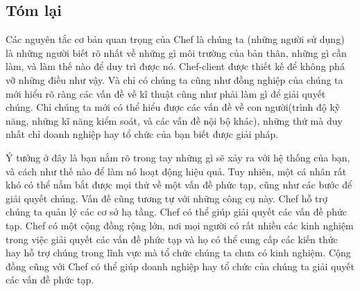 \newpage
\clearpage

\subsection*{Tóm lại}

Các nguyên tắc cơ bản quan trọng của Chef là chúng ta (những người sử dụng) là những người biết rõ nhất về những gì môi trường của bản thân, những gì cần làm, và làm thế nào để duy trì được nó. Chef-client được thiết kế để không phá vỡ những điều như vậy. Và chỉ có chúng ta cũng như đồng nghiệp của chúng ta mới hiểu rõ ràng các vấn đề về kĩ thuật cũng như phải làm gì để giải quyết chúng. Chỉ chúng ta mới có thể hiểu được các vấn đề về con người(trình độ kỹ năng, những kĩ năng kiểm soát, và các vấn đề nội bộ khác), những thứ mà duy nhất chỉ doanh nghiệp hay tổ chức của bạn biết được giải pháp.

Ý tưởng ở đây là bạn nắm rõ trong tay những gì sẽ xảy ra với hệ thống của bạn, và cách như thế nào để làm nó hoạt động hiệu quả. Tuy nhiên, một cá nhân rất khó có thể nắm bắt được mọi thứ về một vấn đề phức tạp, cũng như các bước để giải quyết chúng. Vấn đề cũng tương tự với những công cụ này. Chef hỗ trợ chúng ta quản lý các cơ sở hạ tầng. Chef có thể giúp giải quyết các vấn đề phức tạp. Chef có một cộng đồng rộng lớn, nơi mọi người có rất nhiều các kinh nghiệm trong việc giải quyết các vấn đề phức tạp và họ có thể cung cấp các kiến thức hay hỗ trợ chúng trong lĩnh vực mà tổ chức chúng ta chưa có kinh nghiệm. Cộng đồng cũng với Chef có thể giúp doanh nghiệp hay tổ chức của chúng ta giải quyết các vấn đề phức tạp.
